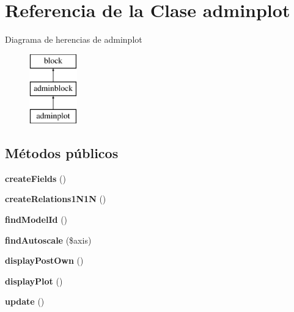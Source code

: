 \hypertarget{classadminplot}{}\section{Referencia de la Clase adminplot}
\label{classadminplot}
Diagrama de herencias de adminplot\begin{figure}[H]
\begin{center}
\leavevmode
\includegraphics[height=3.000000cm]{classadminplot}
\end{center}
\end{figure}
\subsection*{Métodos públicos}
\begin{DoxyCompactItemize}
\item 
\mbox{\label{classadminplot_a2a2a481056d85edf385da065689e1e00}} 
{\bfseries create\+Fields} ()
\item 
\mbox{\label{classadminplot_a76a67aa739701746ba1d7e9ebf188b8b}} 
{\bfseries create\+Relations1\+N1N} ()
\item 
\mbox{\label{classadminplot_a93304fb59e227ce3ec988112c1e94b03}} 
{\bfseries find\+Model\+Id} ()
\item 
\mbox{\label{classadminplot_a3c9246442bd29d4c94d4df518eaafc05}} 
{\bfseries find\+Autoscale} (\$axis)
\item 
\mbox{\label{classadminplot_a7243383e1e65657bca4dd7e67d2fed48}} 
{\bfseries display\+Post\+Own} ()
\item 
\mbox{\label{classadminplot_a14ecb192e537e9861090cb2981dd5324}} 
{\bfseries display\+Plot} ()
\item 
\mbox{\label{classadminplot_adfbbf378d38bc707699a398dd35ea2ac}} 
{\bfseries update} ()
\end{DoxyCompactItemize}
